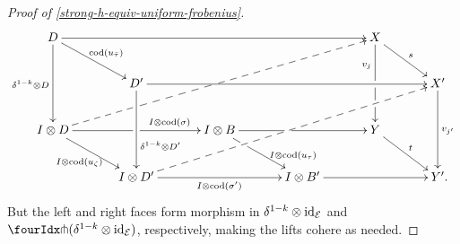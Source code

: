 \documentclass[reqno,10pt,a4paper,oneside,draft]{amsart}
\begin{document}
\begin{proof}[Proof of \cref{strong-h-equiv-uniform-frobenius}]
\[\xymatrix@C+1em{
  D
  \ar[rrrr]
  \ar[dd]_{\kcylinv \otimes D}
  \ar[dr]^{\cod(u_{\bar{\tau}})}
&&&&
  X
  \ar[dd]_(0.3){v_j}|!{[dlll];[dr]}{\hole}|!{[dddlll];[dr]}{\hole}
  \ar[dr]^{s}
\\&
  D'
  \ar[rrrr]
  \ar[dd]^(0.66){\kcylinv \otimes D'}
&&&&
  X'
  \ar[dd]^{v_{j'}}
\\
  \interval \otimes D
  \ar[rr]^(0.7){I \otimes \cod(\sigma)}|!{[ur];[dr]}{\hole}
  \ar@{-->}[uurrrr]|!{[ur];[dr]}{\hole}|!{[ur];[urrrrr]}{\hole} %
  \ar[dr]_{I \otimes \cod(u_{\zeta})}
&&
  \interval \otimes B
  \ar[rr]|!{[dl];[urrr]}{\hole}
  \ar[dr]^(0.7){\interval \otimes \cod(u_\tau)}|!{[dl];[urrr]}{\hole}
&&
  Y
  \ar[dr]^{t}
\\&
  \interval \otimes D'
  \ar[rr]_{I \otimes \cod(\sigma')}
  \ar@{-->}[uurrrr]
&&
  \interval \otimes B'
  \ar[rr]
&&
  Y'
\rlap{.}}
\]
But the left and right faces form morphism in $\delta^{1-k} \otimes \operatorname{id}_{\mathcal{E}}$ and $\liftr{(\kcylinv \otimes \id_\catE)}$, respectively, making the lifts cohere as needed.
\end{proof}



\end{document}
